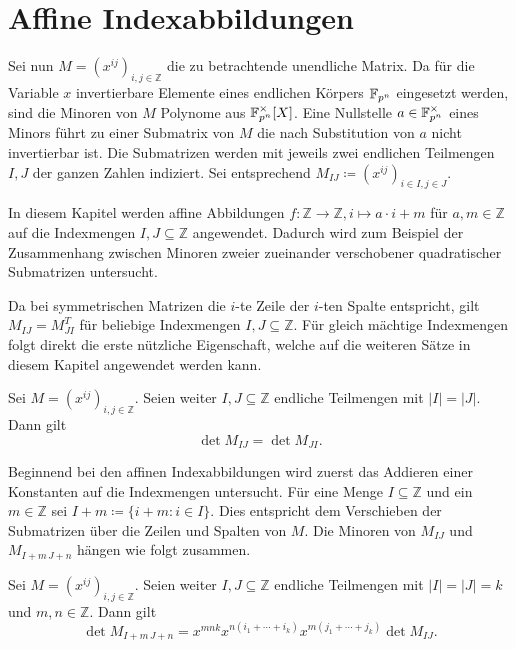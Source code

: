 \section{Affine Indexabbildungen} \label{sec:indextransformationen}

Sei nun $M = \left( x^{ij} \right)_{i,j \in \mathbb{Z}}$ die zu betrachtende unendliche Matrix. Da für die Variable $x$ invertierbare Elemente eines endlichen Körpers $\field{p}[n]$ eingesetzt werden, sind die Minoren von $M$ Polynome aus $\field{p}[n]^\times [X]$. Eine Nullstelle $a \in \field{p}[n]^\times$ eines Minors führt zu einer Submatrix von $M$ die nach Substitution von $a$ nicht invertierbar ist. Die Submatrizen werden mit jeweils zwei endlichen Teilmengen $I,J$ der ganzen Zahlen indiziert. Sei entsprechend $M_{IJ} \coloneqq \left( x^{ij} \right)_{i \in I,j \in J}$.

In diesem Kapitel werden affine Abbildungen $f:\mathbb{Z} \rightarrow \mathbb{Z}, i \mapsto a\cdot i + m$ für $a,m \in \mathbb{Z}$ auf die Indexmengen $I,J \subseteq \mathbb{Z}$ angewendet. Dadurch wird zum Beispiel der Zusammenhang zwischen Minoren zweier zueinander verschobener quadratischer Submatrizen untersucht.

Da bei symmetrischen Matrizen die $i$-te Zeile der $i$-ten Spalte entspricht, gilt $M_{IJ} = M_{JI}^T$ für beliebige Indexmengen $I,J \subseteq \mathbb{Z}$. Für gleich mächtige Indexmengen folgt direkt die erste nützliche Eigenschaft, welche auf die weiteren Sätze in diesem Kapitel angewendet werden kann.

\begin{lemma}
    Sei $M = \left( x^{ij} \right)_{i,j \in \mathbb{Z}}$. Seien weiter $I,J \subseteq \mathbb{Z}$ endliche Teilmengen mit $|I|=|J|$. Dann gilt
    \begin{equation*}
        \det{} M_{IJ} = \det M_{JI}.
    \end{equation*}
\end{lemma}

Beginnend bei den affinen Indexabbildungen wird zuerst das Addieren einer Konstanten auf die Indexmengen untersucht. Für eine Menge $I \subseteq \mathbb{Z}$ und ein $m \in \mathbb{Z}$ sei $I+m \coloneqq \{i+m:i\in I\}$. Dies entspricht dem Verschieben der Submatrizen über die Zeilen und Spalten von $M$. Die Minoren von $M_{IJ}$ und $M_{I+m\,J+n}$ hängen wie folgt zusammen.

\begin{satz} \label{satz:translation}
    Sei $M = \left( x^{ij} \right)_{i,j \in \mathbb{Z}}$. Seien weiter $I,J \subseteq \mathbb{Z}$ endliche Teilmengen mit ${|I|=|J|=k}$ und $m,n \in \mathbb{Z}$. Dann gilt
    \begin{equation*}
        \det{} M_{I+m\,J+n} = x^{mnk} x^{n(i_1+\cdots +i_k)} x^{m(j_1 +\cdots + j_k)} \det{} M_{IJ}.
    \end{equation*}
\end{satz}

